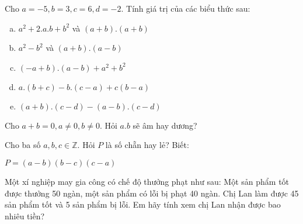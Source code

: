 \begin{bt}
\end{bt}   \begin{bt}
Cho $a= -5, b= 3, c=6, d=-2$. Tính giá trị của các biểu thức sau:

\begin{enumerate}[a)]
\item $a^2+ 2.a.b + b^2$ và $(a+b).(a+b)$
\item $a^2 -b^2$ và $(a+b).(a-b)$
\item $(-a+b).(a-b) + a^2+ b^2$
\item $a.(b+c) - b.(c-a) +c (b-a)$
\item $(a+b).(c-d)  -(a-b). (c-d)$
\end{enumerate}

\end{bt}   \begin{bt}
Cho $a+b=0, a\neq 0, b \neq 0$. Hỏi $a.b$ sẽ âm hay dương?
\end{bt}   \begin{bt}
Cho ba số $a, b, c \in \mathbb{Z}$. Hỏi $P$ là số chẵn hay lẻ? Biết:
\begin{center}
$P = \left( {a - b} \right)\left( {b - c} \right)\left( {c - a} \right)$
\end{center}
\end{bt}   \begin{bt}
Một xí nghiệp may gia công có chế độ thưởng phạt như sau: Một sản phẩm tốt được thưởng 50 ngàn, một sản phẩm có lỗi bị phạt 40 ngàn. Chị Lan làm được 45 sản phẩm tốt và 5 sản phẩm bị lỗi. Em hãy tính xem chị Lan nhận được bao nhiêu tiền?

\end{bt}